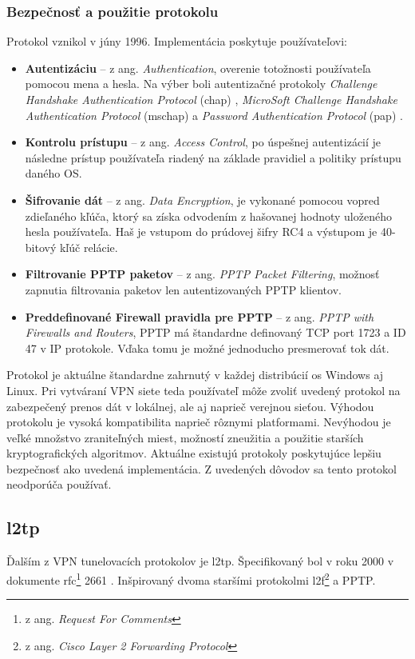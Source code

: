 \subsubsection{Bezpečnosť a použitie protokolu} 
Protokol vznikol v júny 1996. Implementácia poskytuje používateľovi:
\begin{itemize}
	\item{\textbf{Autentizáciu}} -- z ang. \textit{Authentication}, overenie totožnosti používateľa pomocou mena a hesla. Na výber boli autentizačné protokoly \textit{Challenge Handshake Authentication Protocol} (\acrshort{chap}) \cite{chap}, \textit{MicroSoft Challenge Handshake Authentication Protocol} (\acrshort{mschap}) \cite{mschap} a \textit{Password Authentication Protocol} (\acrshort{pap}) \cite{pap}.  
	\item{\textbf{Kontrolu prístupu}} -- z ang. \textit{Access Control}, po úspešnej autentizácií je následne prístup používateľa riadený na základe pravidiel a politiky prístupu daného OS. 
	\item{\textbf{Šifrovanie dát}} -- z ang. \textit{Data Encryption}, je vykonané pomocou vopred zdieľaného kľúča, ktorý sa získa odvodením z hašovanej hodnoty uloženého hesla používateľa. Haš je vstupom do prúdovej šifry RC4 \cite{rc4} a výstupom je  40-bitový kľúč relácie. 
	\item{\textbf{Filtrovanie PPTP paketov}} -- z ang. \textit{PPTP Packet Filtering}, možnosť zapnutia filtrovania paketov len autentizovaných PPTP klientov.
	\item{\textbf{Preddefinované Firewall pravidla pre PPTP}} -- z ang. \textit{PPTP with Firewalls and Routers}, PPTP má štandardne definovaný TCP port 1723 a ID 47 v IP protokole. Vďaka tomu je možné jednoducho presmerovať tok dát.
\end{itemize} 

Protokol je aktuálne štandardne zahrnutý v každej distribúcií \acrshort{os} Windows aj Linux. Pri vytváraní VPN siete teda používateľ môže zvoliť uvedený protokol na zabezpečený prenos dát v lokálnej, ale aj naprieč verejnou sieťou. Výhodou protokolu je vysoká kompatibilita naprieč rôznymi platformami. Nevýhodou je veľké množstvo zraniteľných miest, možností zneužitia a použitie starších kryptografických algoritmov. Aktuálne existujú protokoly poskytujúce lepšiu bezpečnosť ako uvedená implementácia. Z uvedených dôvodov sa tento protokol neodporúča používať.


\subsection{\acrfull{l2tp}}
Ďalším z VPN tunelovacích protokolov je \acrshort{l2tp}. Špecifikovaný bol v roku 2000 v dokumente \acrshort{rfc}\footnote{z ang. \textit{Request For Comments}} 2661 \cite{rfc2661}. Inšpirovaný dvoma staršími protokolmi \acrshort{l2f}\footnote{z ang. \textit{Cisco Layer 2 Forwarding Protocol}} \cite{rfc2341} a PPTP.   

